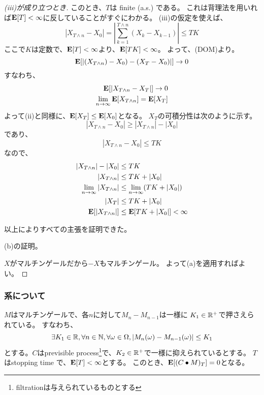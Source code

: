 \begin{proof}
        [(iii)が成り立つとき]
        このとき、$T$は finite (a.s.) である。
        これは背理法を用いれば${\mathbf{E}}[T] < \infty$に反していることがすぐにわかる。
        (iii)の仮定を使えば、
        \[
          |X_{T \wedge n} - X_0| = |\sum_{k=1}^{T \wedge n}(X_k - X_{k-1})| \leq TK
        \]
        ここで$K$は定数で、${\mathbf{E}}[T] < \infty$より、${\mathbf{E}}[TK] < \infty$。
        よって、(DOM)より。
        \[
          {\mathbf{E}}[|(X_{T \wedge n}) - X_0) - (X_T -X_0)|] \rightarrow 0
        \]
        すなわち、
        \begin{align*}
          {\mathbf{E}}[|X_{T \wedge n} -X_T|] \rightarrow 0 \\
          \lim_{n \to \infty}{\mathbf{E}}[X_{T \wedge n}] = {\mathbf{E}}[X_T]
        \end{align*}
        よって(ii)と同様に、${\mathbf{E}}[X_T] \leq {\mathbf{E}}[X_0]$となる。
        $X_T$の可積分性は次のように示す。
        \[
          |X_{T \wedge n} - X_0| \ge |X_{T \wedge n}| - |X_0|
        \]
         であり、
         \[
            |X_{T \wedge n} - X_0| \leq TK
         \]
         なので、
         \begin{align*}
            |X_{T \wedge n}| - |X_0| &\leq TK \\
            |X_{T \wedge n}| &\leq TK + |X_0|\\
            \lim_{n \to \infty}|X_{T \wedge n}| &\leq \lim_{n \to \infty}(TK + |X_0|)\\
            |X_{T}| &\leq TK + |X_0|\\
            {\mathbf{E}}[|X_{T \wedge n}|] &\leq {\mathbf{E}}[TK + |X_0|] < \infty
         \end{align*}

         以上によりすべての主張を証明できた。

         (b)の証明。

         $X$がマルチンゲールだから$-X$もマルチンゲール。
         よって(a)を適用すればよい。
       \end{proof}

      \subsubsection{系について}

        \begin{cor}
        $M$はマルチンゲールで、各$n$に対して$M_n - M_{n-1}$は一様に
        $K_1 \in {\mathbb{R}}^+$で押さえられている。
        すなわち、
        \[
          \exists K_1 \in {\mathbb{R}}, \forall n \in {\mathbb{N}}, \forall \omega \in \Omega, |M_n(\omega) - M_{n-1}(\omega)| \leq K_1
        \]
        とする。$C$はprevisible process\footnote{filtrationは与えられているものとする}で、$K_2 \in {\mathbb{R}}^+$で一様に抑えられているとする。
        $T$はstopping time で、${\mathbf{E}}[T] < \infty$とする。
        このとき、${\mathbf{E}}[(C \bullet M)_T] = 0$となる。
        \end{cor}

